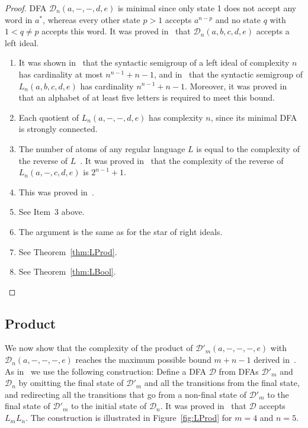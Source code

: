 \documentclass[final]{dmtcs-episciences}
\newcommand{\be}{\begin{enumerate}}
\newcommand{\ee}{\end{enumerate}}
\newcommand{\cD}{{\mathcal D}}
\theoremstyle{definition}
\theoremstyle{remark}
\begin{document}
\begin{proof}
DFA $\cD_n(a,-,-,d,e)$ is minimal  since 
only state 1 does not accept any word in $a^*$, whereas every other state $p >1$ accepts $a^{n-p }$ and no state $q$ with $1<q\neq p$  accepts this word.
It was proved in~\cite{BrYe11} that $\cD_n(a,b,c,d,e)$  accepts a left ideal.
\be
\item
It was shown in~\cite{BrSz14} that the syntactic semigroup of a left ideal of complexity $n$ has cardinality at most $n^{n-1}+n-1$, and
in~\cite{BrYe11} that the syntactic semigroup of $L_n(a,b,c,d,e)$ has cardinality $n^{n-1}+n-1$. 
Moreover, it was proved in~\cite{BSY15} that an alphabet of at least five letters is required to meet this bound. 
\item
Each quotient of $L_n(a,-,-,d,e)$ has complexity $n$, since its minimal DFA is strongly connected.
\item
The number of atoms of any regular language $L$ is equal to the complexity of the reverse of $L$~\cite{BrTa13}. It was proved in~\cite{BrYe11} that the complexity of the reverse of $L_n(a,-,c,d,e)$ is $2^{n-1}+1$.
\item
This was proved in~\cite{BrDa15}.
\item
See Item~3 above.
\item
The argument is the same as for the star of right ideals.
\item
See Theorem~\ref{thm:LProd}.
\item
See Theorem~\ref{thm:LBool}.
\ee
\end{proof}

\subsection{Product}
\label{ssec:product_left}
We now show that the complexity of the product of $\cD'_m(a,-,-,-,e)$ with $\cD_n(a,-,-,-,e)$ 
reaches the maximum possible bound $m+n-1$ derived in~\cite{BJL13}. 
As in~\cite{BJL13} we use the following construction:
Define a DFA $\cD$ from DFAs $\cD'_m$ and $\cD_n$
by omitting  the final state of $\cD'_m$
and all the transitions from the final state,
and redirecting all the transitions that  go
from a non-final state of $\cD'_m$
to the final state of $\cD'_m$
to the initial state of $\cD_n$.
It was proved in~\cite{BJL13} that $\cD$ accepts $L_mL_n$.
The construction is illustrated in Figure~\ref{fig:LProd} for $m=4$ and $n=5$.
\end{document}
